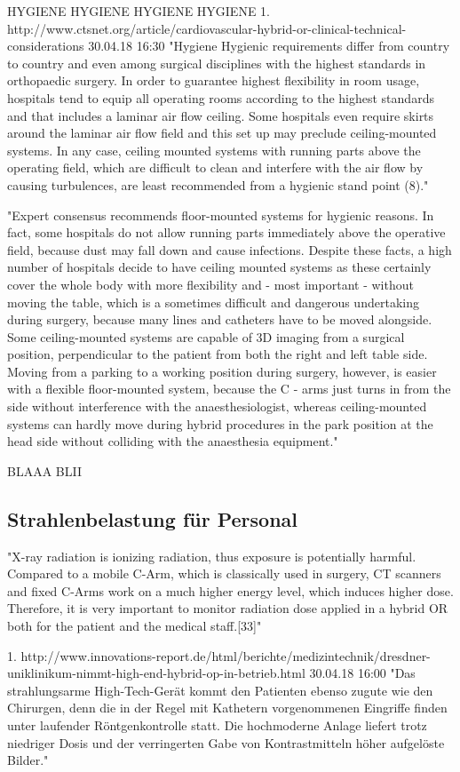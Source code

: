 	
	HYGIENE HYGIENE HYGIENE HYGIENE
	1. http://www.ctsnet.org/article/cardiovascular-hybrid-or-clinical-technical-considerations 30.04.18 16:30
	"Hygiene
	Hygienic requirements differ from country to country and even among surgical disciplines with the highest standards in orthopaedic surgery. In order to guarantee highest flexibility in room usage, hospitals tend to equip all operating rooms according to the highest standards and that includes a laminar air flow ceiling. Some hospitals even require skirts around the laminar air flow field and this set up may preclude ceiling-mounted systems. In any case, ceiling mounted systems with running parts above the operating field, which are difficult to clean and interfere with the air flow by causing turbulences, are least recommended from a hygienic stand point (8)."
	
	"Expert consensus recommends floor-mounted systems for hygienic reasons. In fact, some hospitals do not allow running parts immediately above the operative field, because dust may fall down and cause infections. Despite these facts, a high number of hospitals decide to have ceiling mounted systems as these certainly cover the whole body with more flexibility and - most important - without moving the table, which is a sometimes difficult and dangerous undertaking during surgery, because many lines and catheters have to be moved alongside.  Some ceiling-mounted systems are capable of 3D imaging from a surgical position, perpendicular to the patient from both the right and left table side. Moving from a parking to a working position during surgery, however, is easier with a flexible floor-mounted system, because the C - arms just turns in from the side without interference with the anaesthesiologist, whereas ceiling-mounted systems can hardly move during hybrid procedures in the park position at the head side without colliding with the anaesthesia equipment."
	
	BLAAA BLII


\subsection{Strahlenbelastung für Personal}
	"X-ray radiation is ionizing radiation, thus exposure is potentially harmful. Compared to a mobile C-Arm, which is classically used in surgery, CT scanners and fixed C-Arms work on a much higher energy level, which induces higher dose. Therefore, it is very important to monitor radiation dose applied in a hybrid OR both for the patient and the medical staff.[33]"
	
1. http://www.innovations-report.de/html/berichte/medizintechnik/dresdner-uniklinikum-nimmt-high-end-hybrid-op-in-betrieb.html	 30.04.18 16:00
	"Das strahlungsarme High-Tech-Gerät kommt den Patienten ebenso zugute wie den Chirurgen, denn die in der Regel mit Kathetern vorgenommenen Eingriffe finden unter laufender Röntgenkontrolle statt. Die hochmoderne Anlage liefert trotz niedriger Dosis und der verringerten Gabe von Kontrastmitteln höher aufgelöste Bilder."



